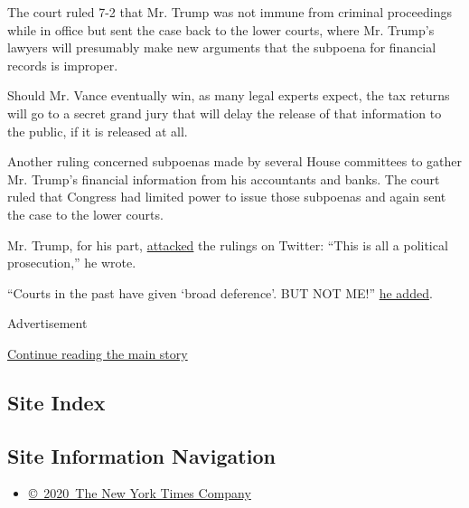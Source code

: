 The court ruled 7-2 that Mr. Trump was not immune from criminal
proceedings while in office but sent the case back to the lower courts,
where Mr. Trump's lawyers will presumably make new arguments that the
subpoena for financial records is improper.

Should Mr. Vance eventually win, as many legal experts expect, the tax
returns will go to a secret grand jury that will delay the release of
that information to the public, if it is released at all.

Another ruling concerned subpoenas made by several House committees to
gather Mr. Trump's financial information from his accountants and banks.
The court ruled that Congress had limited power to issue those subpoenas
and again sent the case to the lower courts.

Mr. Trump, for his part,
\href{https://twitter.com/realDonaldTrump/status/1281236214646034432}{attacked}
the rulings on Twitter: ``This is all a political prosecution,'' he
wrote.

``Courts in the past have given `broad deference'. BUT NOT ME!''
\href{https://twitter.com/realDonaldTrump/status/1281236412667432961}{he
added}.

Advertisement

\protect\hyperlink{after-bottom}{Continue reading the main story}

\hypertarget{site-index}{%
\subsection{Site Index}\label{site-index}}

\hypertarget{site-information-navigation}{%
\subsection{Site Information
Navigation}\label{site-information-navigation}}

\begin{itemize}
\tightlist
\item
  \href{https://help.nytimes.com/hc/en-us/articles/115014792127-Copyright-notice}{©~2020~The
  New York Times Company}
\end{itemize}

